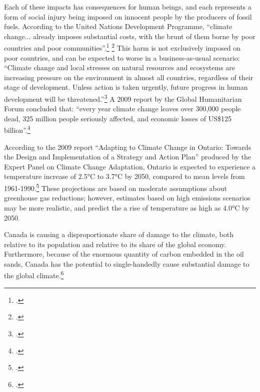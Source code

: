 Each of these impacts has consequences for human beings, and each represents a form of social injury being imposed on innocent people by the producers of fossil fuels.
According to the United Nations Development Programme, ``climate change... already imposes substantial costs, with the brunt of them borne by poor countries and poor communities''.\footcite[][p. 34]{UNHumanDev2013} \footcite[See also: ][]{WorldBankDevCC}
This harm is not exclusively imposed on poor countries, and can be expected to worse in a business-as-usual scenario: ``Climate change and local stresses on natural resources and ecosystems are increasing pressure on the environment in almost all countries, regardless of their stage of development. Unless action is taken urgently, future progress in human development will be threatened.''\footcite[][p. 87]{UNHumanDev2013}
A 2009 report by the Global Humanitarian Forum concluded that: ``every year climate change leaves over 300,000 people 
dead, 325 million people seriously affected, and economic losses of US\$125 billion''.\footcite[][p. 1]{AnatomySilentCrisis}



According to the 2009 report ``Adapting to Climate Change in Ontario: Towards the Design and Implementation of a Strategy and Action Plan'' produced by the Expert Panel on Climate Change Adaptation, Ontario is expected to experience a temperature increase of 2.5°C to 3.7°C by 2050, compared to mean levels from 1961-1990.\footcite[][p. 15]{ExpertPanelAdapting2009}
These projections are based on moderate assumptions about greenhouse gas reductions; however, estimates based on high emissions scenarios may be more realistic, and predict the a rise of temperature as high as 4.0°C by 2050.



Canada is causing a disproportionate share of damage to the climate, both relative to its population and relative to its share of the global economy.
Furthermore, because of the enormous quantity of carbon embedded in the oil sands, Canada has the potential to single-handedly cause substantial damage to the global climate.\footcite[][]{IrrevocablyTar}



